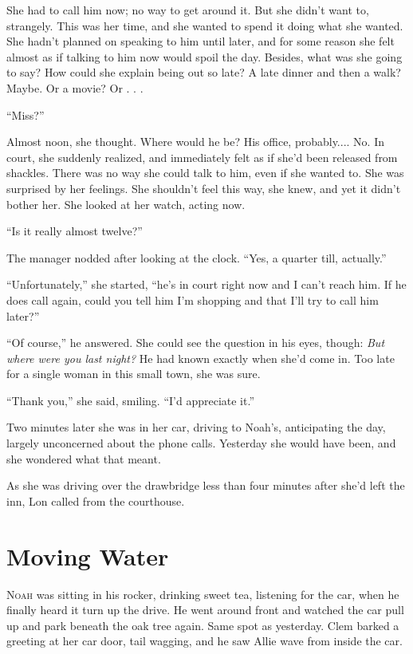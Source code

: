 \documentclass[10pt, twoside, openright]{book}
\newcommand{\chapterornament}[1]{\def\currentornament{#1}}
\def\currentornament{}
\begin{document}
She had to call him now; no way to get around it. But she didn't want
to, strangely. This was her time, and she wanted to spend it doing what
she wanted. She hadn't planned on speaking to him until later, and for
some reason she felt almost as if talking to him now would spoil the
day. Besides, what was she going to say? How could she explain being out
so late? A late dinner and then a walk? Maybe. Or a movie? Or . . .


``Miss?''


Almost noon, she thought. Where would he be? His office, probably....
No. In court, she suddenly realized, and immediately felt as if she'd
been released from shackles. There was no way she could talk to him,
even if she wanted to. She was surprised by her feelings. She shouldn't
feel this way, she knew, and yet it didn't bother her. She looked at her
watch, acting now.


``Is it really almost twelve?''


The manager nodded after looking at the clock. ``Yes, a quarter till,
actually.''

``Unfortunately,'' she started, ``he's in court right now and I can't
reach him. If he does call again, could you tell him I'm shopping and
that I'll try to call him later?''

``Of course,'' he answered. She could see the question in his eyes,
though: \emph{But where were you last night?} He had known exactly when
she'd come in. Too late for a single woman in this small town, she was
sure.


``Thank you,'' she said, smiling. ``I'd appreciate it.''


Two minutes later she was in her car, driving to Noah's, anticipating
the day, largely unconcerned about the phone calls. Yesterday she would
have been, and she wondered what that meant.

As she was driving over the drawbridge less than four minutes after
she'd left the inn, Lon called from the courthouse.

\chapterornament{89}
\chapter{Moving Water}

\lettrine[findent=0.8em, nindent=0.0em]{N}{oah} was sitting in his rocker, drinking sweet tea, listening for the
car, when he finally heard it turn up the drive. He went around front
and watched the car pull up and park beneath the oak tree again. Same
spot as yesterday. Clem barked a greeting at her car door, tail wagging,
and he saw Allie wave from inside the car.
\end{document}
